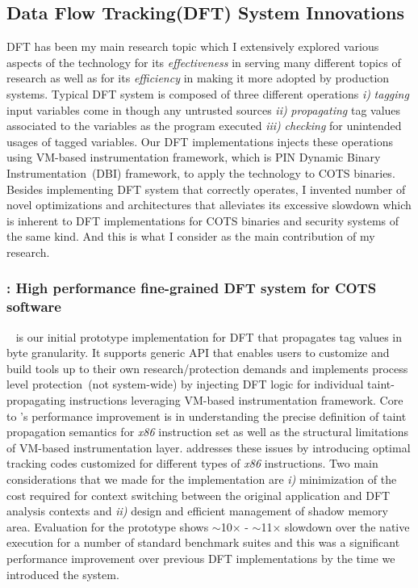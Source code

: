 \documentclass[letterpaper, 10pt]{article}
\begin{document}
\begin{small}
\subsection*{Data Flow Tracking(DFT) System Innovations}
%
DFT has been my main research topic which I extensively explored various
aspects of the technology for its {\it effectiveness} in serving many different
topics of research as well as for its {\it efficiency} in making it more
adopted by production systems.
%
Typical DFT system is composed of three different operations {\it i)} {\it
tagging} input variables come in though any untrusted sources {\it ii)} {\it
propagating} tag values associated to the variables as the program executed
{\it iii)} {\it checking} for unintended usages of tagged variables. Our DFT
implementations injects these operations using VM-based instrumentation
framework, which is PIN Dynamic Binary Instrumentation~(DBI) framework, to
apply the technology to COTS binaries.
%
Besides implementing DFT system that correctly operates, I invented number of
novel optimizations and architectures that alleviates its excessive slowdown
which is inherent to DFT implementations for COTS binaries and security systems
of the same kind. And this is what I consider as the main contribution of my
research.

\subsubsection*{\libdft: High performance fine-grained DFT system for COTS
software}

\libdft~\cite{libdft:2012vee} is our initial prototype implementation for DFT
that propagates tag values in byte granularity.
%
It supports generic API that enables users to customize and build tools up to
their own research/protection demands and implements process level
protection~(not system-wide) by injecting DFT logic for individual
taint-propagating instructions leveraging VM-based instrumentation framework.
%
Core to \libdft's performance improvement is in understanding the precise
definition of taint propagation semantics for {\it x86} instruction set as well
as the structural limitations of VM-based instrumentation layer. \libdft
addresses these issues by introducing optimal tracking codes customized for
different types of {\it x86} instructions. Two main considerations that we made
for the implementation are {\it i)} minimization of the cost required for
context switching between the original application and DFT analysis contexts
and {\it ii)} design and efficient management of shadow memory area.
%
Evaluation for the prototype shows $\sim$10$\times$ - $\sim$11$\times$ slowdown
over the native execution for a number of standard benchmark suites and this
was a significant performance improvement over previous DFT implementations by
the time we introduced the system.


\end{small}
\end{document}
